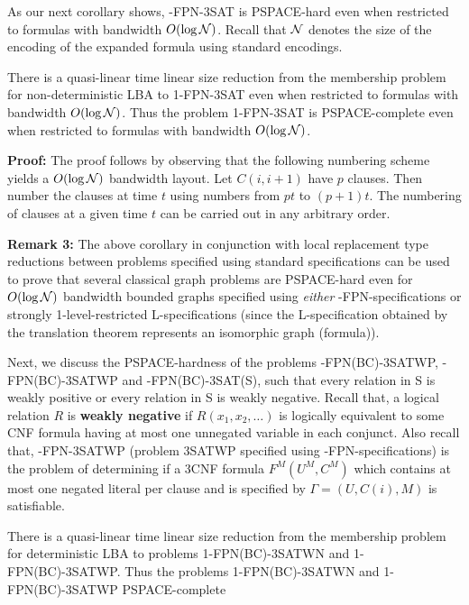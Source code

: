 As our next corollary shows, {-FPN-3SAT} is {\sf PSPACE}-hard 
even when restricted to formulas with bandwidth $O(\log {\cal N})$. 
Recall that ${\cal N}$ denotes the size of the encoding of the expanded formula
using standard encodings.

\begin{corollary}
There is a quasi-linear
time linear size reduction from the membership problem for non-deterministic
LBA to 1-FPN-3SAT even when restricted to formulas with bandwidth
$O(\log {\cal N})$.
Thus the  problem 1-FPN-3SAT is PSPACE-complete even when restricted
to formulas with bandwidth $O(\log {\cal N})$. 
\end{corollary}

\noindent
{\bf Proof:}
The proof follows by observing that the following numbering
scheme yields a $O(\log {\cal N})$ bandwidth layout. 
Let $C(i, i+1)$ have $p$ clauses.
Then number the clauses at time $t$ using numbers from $pt$ to $(p+1)t$.
The numbering of clauses at a given time $t$ can be carried out in
any arbitrary order.\QED


\noindent
{\bf Remark 3:} The above corollary in conjunction with local replacement
type reductions between problems specified using standard specifications
can be used to prove that several classical graph problems are 
{\sf PSPACE}-hard even for $O(\log {\cal N})$ bandwidth bounded graphs
specified using {\em either}  {-FPN}-specifications or
strongly 1-level-restricted {\sf L}-specifications (since the 
{\sf L}-specification obtained by the translation theorem represents an
isomorphic graph (formula)). 



Next, we discuss the {\sf PSPACE}-hardness of the problems 
{-FPN(BC)-3SATWP}, {-FPN(BC)-3SATWP} and 
{-FPN(BC)-3SAT(S)}, such that every relation in {\sf S} is 
weakly positive or every relation in {\sf S} is weakly negative.
Recall that, a logical relation $R$ is {\bf weakly negative} if
$R(x_1,x_2,\ldots)$ is logically equivalent to some CNF formula having at
most one unnegated variable in each conjunct. Also recall that,
{-FPN-3SATWP} (problem 3SATWP specified using 
{-FPN}-specifications)  is the problem of determining if a 3CNF formula
$F^{M}(U^{M}, C^{M})$ which contains at most one negated 
literal per clause and is specified by $\Gamma= (U,C(i),M)$ is satisfiable.



\begin{theorem}\label{th:fpn3satwnhard}
There is a quasi-linear
time linear size reduction from the membership problem for deterministic
LBA to problems 1-FPN(BC)-3SATWN and  1-FPN(BC)-3SATWP.
Thus the problems 1-FPN(BC)-3SATWN and  1-FPN(BC)-3SATWP PSPACE-complete
\end{theorem}



